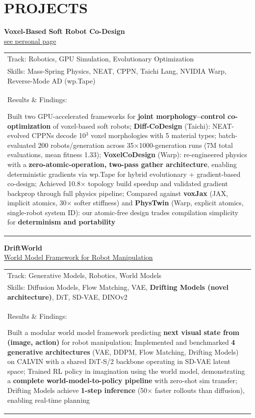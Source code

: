 \documentclass[a4paper,9pt]{extarticle}
\begin{document}
\section*{PROJECTS}
    \textbf{\Large Voxel-Based Soft Robot Co-Design} \\
    \href{https://jacobgit2.github.io/}{see personal page}\\
    \vspace{2pt}
    \noindent
    \begin{tabular}{@{$\circ$\hspace{0.5em}} l}
        Track: Robotics, GPU Simulation, Evolutionary Optimization \\
        Skills: Mass-Spring Physics, NEAT, CPPN, Taichi Lang, NVIDIA Warp, Reverse-Mode AD (wp.Tape) \\
        Results \& Findings:
        \parbox[t]{0.85\textwidth}
        {Built two GPU-accelerated frameworks for \textbf{joint morphology--control co-optimization} of voxel-based soft robots;
        \textbf{Diff-CoDesign} (Taichi): NEAT-evolved CPPNs decode 10$^3$ voxel morphologies with 5 material types;
        batch-evaluated 200 robots/generation across 35$\times$1000-generation runs (7M total evaluations, mean fitness 1.33);
        \textbf{VoxelCoDesign} (Warp): re-engineered physics with a \textbf{zero-atomic-operation, two-pass gather architecture},
        enabling deterministic gradients via wp.Tape for hybrid evolutionary + gradient-based co-design;
        Achieved 10.8$\times$ topology build speedup and validated gradient backprop through full physics pipeline;
        Compared against \textbf{voxJax} (JAX, implicit atomics, 30$\times$ softer stiffness) and
        \textbf{PhysTwin} (Warp, explicit atomics, single-robot system ID):
        our atomic-free design trades compilation simplicity for \textbf{determinism and portability}}
    \end{tabular}
    \textbf{\Large DriftWorld}\\
    \href{https://github.com/JacobGIT2/DriftWorld.git}{World Model Framework for Robot Manipulation} \\
    \vspace{2pt}
    \noindent
    \begin{tabular}{@{$\circ$\hspace{0.5em}} l}
        Track: Generative Models, Robotics, World Models \\
        Skills: Diffusion Models, Flow Matching, VAE, \textbf{Drifting Models (novel architecture)}, DiT, SD-VAE, DINOv2 \\
        Results \& Findings:
        \parbox[t]{0.85\textwidth}
        {Built a modular world model framework predicting \textbf{next visual state from (image, action)} for robot manipulation;
        Implemented and benchmarked \textbf{4 generative architectures} (VAE, DDPM, Flow Matching, Drifting Models)
        on CALVIN with a shared DiT-S/2 backbone operating in SD-VAE latent space;
        Trained RL policy in imagination using the world model, demonstrating a
        \textbf{complete world-model-to-policy pipeline} with zero-shot sim transfer;
        Drifting Models achieve \textbf{1-step inference} (50$\times$ faster rollouts than diffusion), enabling real-time planning}
    \end{tabular}
\end{document}
